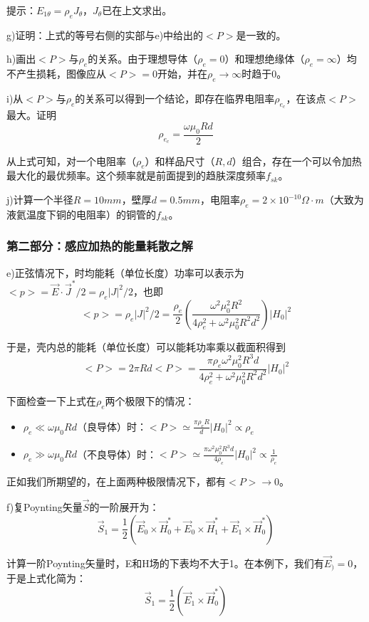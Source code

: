 提示：$E_{1\theta}=\rho_e J_\theta$，$J_\theta$已在上文求出。

g)证明：上式的等号右侧的实部与e)中给出的$<P>$是一致的。

h)画出$<P>$与$\rho_e$的关系。由于理想导体（$\rho_e=0$）和理想绝缘体（$\rho_e=\infty$）均不产生损耗，图像应从$<P>=0$开始，并在$\rho_e \rightarrow \infty$时趋于0。

i)从$<P>$与$\rho_e$的关系可以得到一个结论，即存在临界电阻率$\rho_{e_c}$，在该点$<P>$最大。证明
$$\rho_{e_c}=\frac{\omega \mu_0 R d}{2}$$

从上式可知，对一个电阻率（$\rho_e$）和样品尺寸（$R,d$）组合，存在一个可以令加热最大化的最优频率。这个频率就是前面提到的趋肤深度频率$f_{sk}$。

j)计算一个半径$R=10mm$，壁厚$d=0.5mm$，电阻率$\rho_e=2\times 10^{-10} \Omega\cdot m$（大致为液氦温度下铜的电阻率）的铜管的$f_{sk}$。

\subsubsection*{第二部分：感应加热的能量耗散之解}
e)正弦情况下，时均能耗（单位长度）功率可以表示为$<p>=\vec{E}\cdot \vec{J}^* /2=\rho_e |J|^2 /2$，也即
$$<p>=\rho_e |J|^2 /2=\frac{\rho_e}{2}(\frac{\omega^2 \mu_0^2 R^2}{4\rho_e^2+\omega^2 \mu_0^2 R^2 d^2})|H_0|^2$$

于是，壳内总的能耗（单位长度）可以能耗功率乘以截面积得到
$$<P>=2\pi R d<P>=\frac{\pi \rho_e \omega^2 \mu_0^2 R^3 d}{4\rho_e^2+\omega^2 \mu_0^2 R^2 d^2}|H_0|^2$$

下面检查一下上式在$\rho_e$两个极限下的情况：
\begin{itemize}
  \item $\rho_e \ll \omega \mu_0 R d$（良导体）时：$<P>\simeq \frac{\pi \rho_e R}{d}|H_0|^2\propto \rho_e$
  \item $\rho_e \gg \omega \mu_0 R d$（不良导体）时：$<P>\simeq \frac{\pi \omega^2 \mu_0^2 R^3 d}{4\rho_e}|H_0|^2\propto \frac{1}{\rho_e}$
\end{itemize}

正如我们所期望的，在上面两种极限情况下，都有$<P>\rightarrow 0$。

f)复Poynting矢量$\vec{S}$的一阶展开为：
$$\vec{S}_1=\frac{1}{2}(\vec{E}_0 \times \vec{H}_0^*+\vec{E}_0 \times \vec{H}_1^*+\vec{E}_1 \times \vec{H}_0^*)$$

计算一阶Poynting矢量时，E和H场的下表均不大于1。在本例下，我们有$\vec{E}_)=0$，于是上式化简为：
$$\vec{S}_1=\frac{1}{2}(\vec{E}_1 \times \vec{H}_0^*)$$

